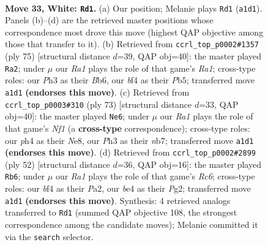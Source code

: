 \documentclass[11pt]{article}
\begin{document}
\clearpage

\begin{figure}[p]\centering
\begin{subfigure}{0.46\textwidth}\centering
\resizebox{\linewidth}{!}{%
\newchessgame
\chessboard[
  setfen={r1k3n1/3n1N2/8/6p1/pp2bb1p/7P/P4KP1/R7 w - - 0 33},
  showmover=false,
  pgfstyle=straightmove, color=movearrow, markmove={a1-d1}
]}
\caption{}
\end{subfigure}\hfill
\begin{subfigure}{0.46\textwidth}\centering
\resizebox{\linewidth}{!}{%
\newchessgame
\chessboard[
  setfen={r7/3k3p/1b3p2/1p1np3/1P2N1P1/5P2/3BP3/2R2K2 b - - 4 38},
  showmover=false,
  pgfstyle=straightmove, color=movearrow, markmove={a8-a2}
]}
\caption{}
\end{subfigure}
\\[4pt]
\begin{subfigure}{0.46\textwidth}\centering
\resizebox{\linewidth}{!}{%
\newchessgame
\chessboard[
  setfen={4nn1k/1N4p1/2p4p/1p6/1P6/3B1K1P/r1P3P1/1R6 b - - 0 37},
  showmover=false,
  pgfstyle=straightmove, color=movearrow, markmove={f8-e6}
]}
\caption{}
\end{subfigure}\hfill
\begin{subfigure}{0.46\textwidth}\centering
\resizebox{\linewidth}{!}{%
\newchessgame
\chessboard[
  setfen={r5k1/5p2/2RBb1pp/8/p2P3P/1P6/P5P1/6K1 w - - 0 27},
  showmover=false,
  pgfstyle=straightmove, color=movearrow, markmove={c6-b6}
]}
\caption{}
\end{subfigure}
\caption{\textbf{Move 33, White: \texttt{Rd1}.} (a) Our position; Melanie plays \texttt{Rd1} (\texttt{a1d1}). Panels (b)--(d) are the retrieved master positions whose correspondence most drove this move (highest QAP objective among those that transfer to it). (b) Retrieved from \texttt{ccrl\_top\_p0002\#1357} (ply 75) [structural distance $d$=39, QAP obj=40]: the master played \texttt{Ra2}; under $\mu$ our \emph{Ra1} plays the role of that game's \emph{Ra1}; cross-type roles: our \emph{P}h3 as their \emph{B}b6, our \emph{b}f4 as their \emph{P}b5; transferred move \texttt{a1d1} \textbf{(endorses this move)}. (c) Retrieved from \texttt{ccrl\_top\_p0003\#310} (ply 73) [structural distance $d$=33, QAP obj=40]: the master played \texttt{Ne6}; under $\mu$ our \emph{Ra1} plays the role of that game's \emph{Nf1} (a \textbf{cross-type} correspondence); cross-type roles: our \emph{p}h4 as their \emph{N}e8, our \emph{P}h3 as their \emph{n}b7; transferred move \texttt{a1d1} \textbf{(endorses this move)}. (d) Retrieved from \texttt{ccrl\_top\_p0002\#2899} (ply 52) [structural distance $d$=36, QAP obj=16]: the master played \texttt{Rb6}; under $\mu$ our \emph{Ra1} plays the role of that game's \emph{Rc6}; cross-type roles: our \emph{b}f4 as their \emph{P}a2, our \emph{b}e4 as their \emph{P}g2; transferred move \texttt{a1d1} \textbf{(endorses this move)}. Synthesis: 4 retrieved analogs transferred to \texttt{Rd1} (summed QAP objective 108, the strongest correspondence among the candidate moves); Melanie committed it via the \texttt{search} selector.}
\label{fig:thought-m64}
\end{figure}
\end{document}
